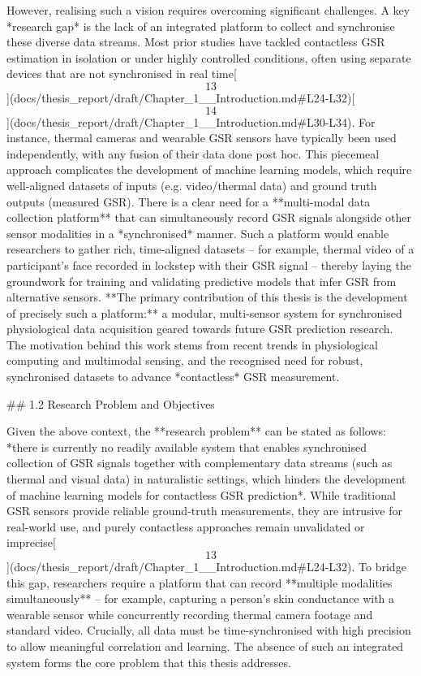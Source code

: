 \documentclass[12pt,a4paper]{article}
\begin{document}
However, realising such a vision requires overcoming significant
challenges. A key *research gap* is the lack of an integrated platform
to collect and synchronise these diverse data streams. Most prior
studies have tackled contactless GSR estimation in isolation or under
highly controlled conditions, often using separate devices that are not
synchronised in real
time[\[13\]](docs/thesis_report/draft/Chapter_1__Introduction.md#L24-L32)[\[14\]](docs/thesis_report/draft/Chapter_1__Introduction.md#L30-L34).
For instance, thermal cameras and wearable GSR sensors have typically
been used independently, with any fusion of their data done post hoc.
This piecemeal approach complicates the development of machine learning
models, which require well-aligned datasets of inputs (e.g.
video/thermal data) and ground truth outputs (measured GSR). There is a
clear need for a **multi-modal data collection platform** that can
simultaneously record GSR signals alongside other sensor modalities in a
*synchronised* manner. Such a platform would enable researchers to
gather rich, time-aligned datasets -- for example, thermal video of a
participant's face recorded in lockstep with their GSR signal -- thereby
laying the groundwork for training and validating predictive models that
infer GSR from alternative sensors. **The primary contribution of this
thesis is the development of precisely such a platform:** a modular,
multi-sensor system for synchronised physiological data acquisition
geared towards future GSR prediction research. The motivation
behind this work stems from recent trends in physiological computing and
multimodal sensing, and the recognised need for robust, synchronised
datasets to advance *contactless* GSR measurement.

## 1.2 Research Problem and Objectives

Given the above context, the **research problem** can be stated as
follows: *there is currently no readily available system that enables
synchronised collection of GSR signals together with complementary data
streams (such as thermal and visual data) in naturalistic settings,
which hinders the development of machine learning models for contactless
GSR prediction*. While traditional GSR sensors provide reliable
ground-truth measurements, they are intrusive for real-world use, and
purely contactless approaches remain unvalidated or
imprecise[\[13\]](docs/thesis_report/draft/Chapter_1__Introduction.md#L24-L32).
To bridge this gap, researchers require a platform that can record
**multiple modalities simultaneously** -- for example, capturing a
person's skin conductance with a wearable sensor while concurrently
recording thermal camera footage and standard video. Crucially, all data
must be time-synchronised with high precision to allow meaningful
correlation and learning. The absence of such an integrated system forms
the core problem that this thesis addresses.
\end{document}

